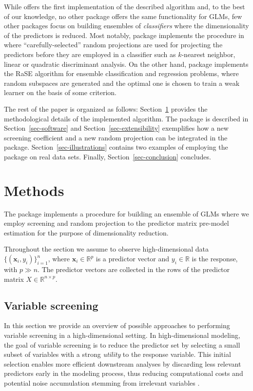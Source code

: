 \documentclass[
  article]{jss}
\begin{document}
While  offers the first implementation of the described
algorithm and, to the best of our knowledge, no other package offers the
same functionality for GLMs, few other  packages focus on
building ensembles of \emph{classifiers} where the dimensionality of the
predictors is reduced. Most notably, package 
\citep{RPEnsembleR} implements the procedure in
\citet{cannings2017random} where ``carefully-selected'' random
projections are used for projecting the predictors before they are
employed in a classifier such as \(k\)-nearest neighbor, linear or
quadratic discriminant analysis. On the other hand, package 
\citep{pkg:RaSEn} implements the RaSE algorithm for ensemble
classification and regression problems, where random subspaces are
generated and the optimal one is chosen to train a weak learner on the
basis of some criterion.

The rest of the paper is organized as follows: Section~\ref{sec-models}
provides the methodological details of the implemented algorithm. The
package is described in Section~\ref{sec-software} and
Section~\ref{sec-extensibility} exemplifies how a new screening
coefficient and a new random projection can be integrated in the
package. Section~\ref{sec-illustrations} contains two examples of
employing the package on real data sets. Finally,
Section~\ref{sec-conclusion} concludes.

\section{Methods}\label{sec-models}

The package implements a procedure for building an ensemble of GLMs
where we employ screening and random projection to the predictor matrix
pre-model estimation for the purpose of dimensionality reduction.

Throughout the section we assume to observe high-dimensional data
\(\{(\boldsymbol{x}_i,y_i)\}_{i=1}^n\), where
\(\boldsymbol{x}_i\in\mathbb{R}^p\) is a predictor vector and
\(y_i\in\mathbb{R}\) is the response, with \(p\gg n\). The predictor
vectors are collected in the rows of the predictor matrix
\(X\in \mathbb R^{n\times p}\).

\subsection{Variable screening}\label{variable-screening}

In this section we provide an overview of possible approaches to
performing variable screening in a high-dimensional setting. In
high-dimensional modeling, the goal of variable screening is to reduce
the predictor set by selecting a small subset of variables with a strong
\emph{utility} to the response variable. This initial selection enables
more efficient downstream analyses by discarding less relevant
predictors early in the modeling process, thus reducing computational
costs and potential noise accumulation stemming from irrelevant
variables \citep[see e.g.,][]{Dunson2020TargRandProj}.
\end{document}
